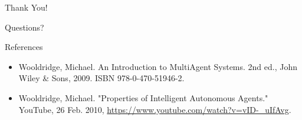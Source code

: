 \documentclass{beamer}
\begin{document}
\begin{frame}
    \centering
    \vspace{2cm}
    {\Large Thank You!}
    \vspace{1cm}
    
    {\large Questions?}
\end{frame}

\begin{frame}{References}
    \begin{itemize}
        \item Wooldridge, Michael. An Introduction to MultiAgent Systems. 2nd ed., John Wiley \& Sons, 2009. ISBN 978-0-470-51946-2.
        \item Wooldridge, Michael. "Properties of Intelligent Autonomous Agents." YouTube, 26 Feb. 2010, \url{https://www.youtube.com/watch?v=vID-_uIfAvg}.
    \end{itemize}
\end{frame}
\end{document}
